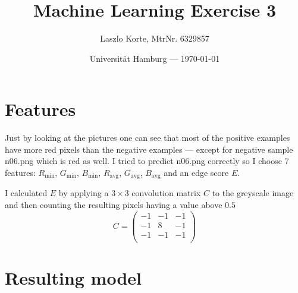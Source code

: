 \documentclass[parskip=half,a4paper]{scrartcl}
\title{Machine Learning Exercise 3}
\author{Laszlo Korte, MtrNr. 6329857}
\date{Universität Hamburg --- \today}
\begin{document}
\maketitle

\section*{Features}

Just by looking at the pictures one can see that most of the positive examples have more red pixels than the negative examples --- except for negative sample n06.png which is red as well. I tried to predict n06.png correctly so I choose 7 features: $R_{\text{min}}$, $G_{\text{min}}$, $B_{\text{min}}$, $R_{\text{avg}}$, $G_{\text{avg}}$, $B_{\text{avg}}$ and an edge score $E$.

I calculated $E$ by applying a $3\times3$ convolution matrix $C$ to the greyscale image and then counting the resulting pixels having a value above $0.5$ \[C = \begin{pmatrix}
  -1 & -1 & -1 \\
  -1 & 8 & -1 \\
  -1 & -1 & -1 \\
\end{pmatrix}\]

\section*{Resulting model}
\end{document}
